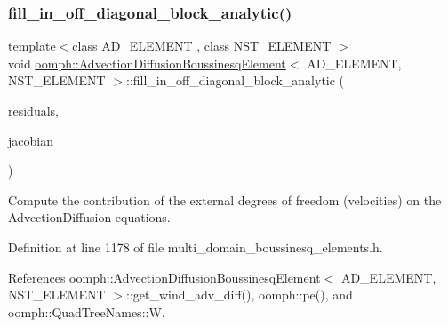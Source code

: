 \subsubsection{\texorpdfstring{fill\+\_\+in\+\_\+off\+\_\+diagonal\+\_\+block\+\_\+analytic()}{fill\_in\_off\_diagonal\_block\_analytic()}}
{\footnotesize\ttfamily template$<$class A\+D\+\_\+\+E\+L\+E\+M\+E\+NT , class N\+S\+T\+\_\+\+E\+L\+E\+M\+E\+NT $>$ \\
void \hyperlink{classoomph_1_1AdvectionDiffusionBoussinesqElement}{oomph\+::\+Advection\+Diffusion\+Boussinesq\+Element}$<$ A\+D\+\_\+\+E\+L\+E\+M\+E\+NT, N\+S\+T\+\_\+\+E\+L\+E\+M\+E\+NT $>$\+::fill\+\_\+in\+\_\+off\+\_\+diagonal\+\_\+block\+\_\+analytic (\begin{DoxyParamCaption}\item[{\hyperlink{classoomph_1_1Vector}{Vector}$<$ double $>$ \&}]{residuals,  }\item[{\hyperlink{classoomph_1_1DenseMatrix}{Dense\+Matrix}$<$ double $>$ \&}]{jacobian }\end{DoxyParamCaption})\hspace{0.3cm}{\ttfamily [inline]}}



Compute the contribution of the external degrees of freedom (velocities) on the Advection\+Diffusion equations. 



Definition at line 1178 of file multi\+\_\+domain\+\_\+boussinesq\+\_\+elements.\+h.



References oomph\+::\+Advection\+Diffusion\+Boussinesq\+Element$<$ A\+D\+\_\+\+E\+L\+E\+M\+E\+N\+T, N\+S\+T\+\_\+\+E\+L\+E\+M\+E\+N\+T $>$\+::get\+\_\+wind\+\_\+adv\+\_\+diff(), oomph\+::pe(), and oomph\+::\+Quad\+Tree\+Names\+::W.

\mbox{\label{classoomph_1_1AdvectionDiffusionBoussinesqElement_a89ea74af5d011a3866999c3760621edf}} 
